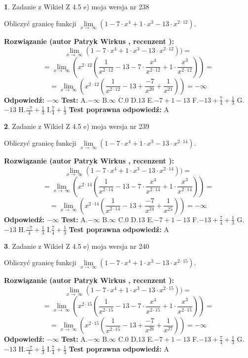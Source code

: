 \documentclass[12pt, a4paper]{article}
\theoremstyle{definition} %
\newtheorem{zad}{}
\newcommand{\zadStart}[1]{\begin{zad}#1\newline}
\newcommand{\zadStop}{\end{zad}}
\newcommand{\rozwStart}[2]{\noindent \textbf{Rozwiązanie (autor #1 , recenzent #2): }\newline}
\newcommand{\rozwStop}{\newline}
\newcommand{\odpStart}{\noindent \textbf{Odpowiedź:}\newline}
\newcommand{\odpStop}{\newline}
\newcommand{\testStart}{\noindent \textbf{Test:}\newline}
\newcommand{\testStop}{\newline}
\newcommand{\kluczStart}{\noindent \textbf{Test poprawna odpowiedź:}\newline}
\newcommand{\kluczStop}{\newline}
\begin{document}
\zadStart{Zadanie z Wikieł Z 4.5 e) moja wersja nr 238}



Obliczyć granicę funkcji  $\lim\limits_{x\to\ \infty}(1 - 7 \cdot x^{4}+1 \cdot x^{3}- 13 \cdot x^{2\cdot12})$.
\zadStop
\rozwStart{Patryk Wirkus}{}
$$\lim\limits_{x\to\ \infty}(1 - 7 \cdot x^{4}+1 \cdot x^{3}- 13 \cdot x^{2\cdot12}))=$$
$$=\lim\limits_{x\to\ \infty}(x^{2\cdot12}(\frac{1}{x^{2\cdot12}}-13 -7 \cdot \frac{x^{4}}{x^{2\cdot12}}+1 \cdot \frac{x^{3}}{x^{2\cdot12}}))=$$
$$=\lim\limits_{x\to\ \infty}(x^{2\cdot12}(\frac{1}{x^{2\cdot12}}-13 + \frac{-7}{x^{20}}+ \frac{1}{x^{21}}))=-\infty$$
\rozwStop
\odpStart
$-\infty$
\odpStop
\testStart
A.$-\infty$ B.$\infty$ C.$0$ D.$13$ E.$-7 + 1 - 13$
F.$-13+\frac{7}{4}+\frac{1}{3}$ G.$-13$
H.$\frac{-7}{4}+\frac{1}{3}$
I.$\frac{7}{4}+\frac{1}{3}$
\testStop
\kluczStart
A
\kluczStop



\zadStart{Zadanie z Wikieł Z 4.5 e) moja wersja nr 239}



Obliczyć granicę funkcji  $\lim\limits_{x\to\ \infty}(1 - 7 \cdot x^{4}+1 \cdot x^{3}- 13 \cdot x^{2\cdot14})$.
\zadStop
\rozwStart{Patryk Wirkus}{}
$$\lim\limits_{x\to\ \infty}(1 - 7 \cdot x^{4}+1 \cdot x^{3}- 13 \cdot x^{2\cdot14}))=$$
$$=\lim\limits_{x\to\ \infty}(x^{2\cdot14}(\frac{1}{x^{2\cdot14}}-13 -7 \cdot \frac{x^{4}}{x^{2\cdot14}}+1 \cdot \frac{x^{3}}{x^{2\cdot14}}))=$$
$$=\lim\limits_{x\to\ \infty}(x^{2\cdot14}(\frac{1}{x^{2\cdot14}}-13 + \frac{-7}{x^{24}}+ \frac{1}{x^{25}}))=-\infty$$
\rozwStop
\odpStart
$-\infty$
\odpStop
\testStart
A.$-\infty$ B.$\infty$ C.$0$ D.$13$ E.$-7 + 1 - 13$
F.$-13+\frac{7}{4}+\frac{1}{3}$ G.$-13$
H.$\frac{-7}{4}+\frac{1}{3}$
I.$\frac{7}{4}+\frac{1}{3}$
\testStop
\kluczStart
A
\kluczStop



\zadStart{Zadanie z Wikieł Z 4.5 e) moja wersja nr 240}



Obliczyć granicę funkcji  $\lim\limits_{x\to\ \infty}(1 - 7 \cdot x^{4}+1 \cdot x^{3}- 13 \cdot x^{2\cdot15})$.
\zadStop
\rozwStart{Patryk Wirkus}{}
$$\lim\limits_{x\to\ \infty}(1 - 7 \cdot x^{4}+1 \cdot x^{3}- 13 \cdot x^{2\cdot15}))=$$
$$=\lim\limits_{x\to\ \infty}(x^{2\cdot15}(\frac{1}{x^{2\cdot15}}-13 -7 \cdot \frac{x^{4}}{x^{2\cdot15}}+1 \cdot \frac{x^{3}}{x^{2\cdot15}}))=$$
$$=\lim\limits_{x\to\ \infty}(x^{2\cdot15}(\frac{1}{x^{2\cdot15}}-13 + \frac{-7}{x^{26}}+ \frac{1}{x^{27}}))=-\infty$$
\rozwStop
\odpStart
$-\infty$
\odpStop
\testStart
A.$-\infty$ B.$\infty$ C.$0$ D.$13$ E.$-7 + 1 - 13$
F.$-13+\frac{7}{4}+\frac{1}{3}$ G.$-13$
H.$\frac{-7}{4}+\frac{1}{3}$
I.$\frac{7}{4}+\frac{1}{3}$
\testStop
\kluczStart
A
\kluczStop
\end{document}
